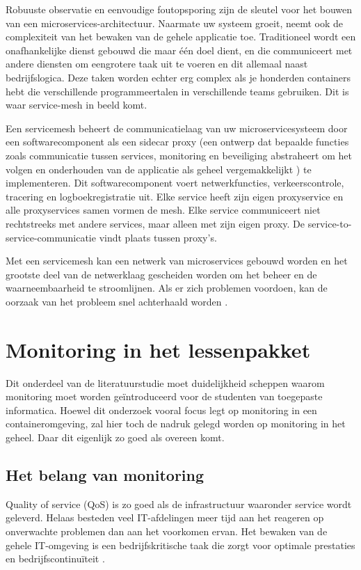 Robuuste observatie en eenvoudige foutopsporing zijn de sleutel voor het bouwen van een microservices-architectuur. Naarmate uw systeem groeit, neemt ook de complexiteit van het bewaken van de gehele applicatie toe. Traditioneel wordt een onafhankelijke dienst gebouwd die maar één doel dient, en die communiceert met andere diensten om een ​​grotere taak uit te voeren en dit allemaal naast bedrijfslogica. Deze taken worden echter erg complex als je honderden containers hebt die verschillende programmeertalen in verschillende teams gebruiken. Dit is waar service-mesh in beeld komt. 

Een servicemesh beheert de communicatielaag van uw microservicesysteem door een softwarecomponent als een sidecar proxy (een ontwerp dat bepaalde functies zoals communicatie tussen services, monitoring en beveiliging abstraheert om het volgen en onderhouden van de applicatie als geheel vergemakkelijkt \autocite{Gilles2019}) te implementeren. Dit softwarecomponent voert netwerkfuncties, verkeerscontrole, tracering en logboekregistratie uit. Elke service heeft zijn eigen proxyservice en alle proxyservices samen vormen de mesh. Elke service communiceert niet rechtstreeks met andere services, maar alleen met zijn eigen proxy. De service-to-service-communicatie vindt plaats tussen proxy's. 

Met een servicemesh kan een netwerk van microservices gebouwd worden en het grootste deel van de netwerklaag gescheiden worden om het beheer en de waarneembaarheid te stroomlijnen. Als er zich problemen voordoen, kan de oorzaak van het probleem snel achterhaald worden \autocite{AWS2021}.

\section{Monitoring in het lessenpakket}

Dit onderdeel van de literatuurstudie moet duidelijkheid scheppen waarom monitoring moet worden geïntroduceerd voor de studenten van toegepaste informatica. Hoewel dit onderzoek vooral focus legt op monitoring in een containeromgeving, zal hier toch de nadruk gelegd worden op monitoring in het geheel. Daar dit eigenlijk zo goed als overeen komt.

\subsection{Het belang van monitoring}

Quality of service (QoS) is zo goed als de infrastructuur waaronder service wordt geleverd. Helaas besteden veel IT-afdelingen meer tijd aan het reageren op onverwachte problemen dan aan het voorkomen ervan. Het bewaken van de gehele IT-omgeving is een bedrijfskritische taak die zorgt voor optimale prestaties en bedrijfscontinuïteit \autocite{Matrix2016}.

